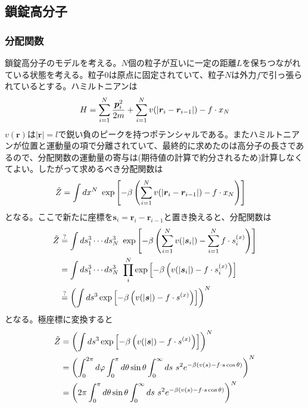 \documentclass[dvipdfmx, 11pt, a4paper]{jsarticle}
\theoremstyle{definition}
\begin{document}
\subsection{鎖錠高分子}
\subsubsection{分配関数}
    鎖錠高分子のモデルを考える。$N$個の粒子が互いに一定の距離$L$を保ちつながれている状態を考える。粒子$0$は原点に固定されていて、粒子$N$は外力$f$で引っ張られているとする。ハミルトニアンは
    \begin{align}
        H = \sum_{i=1}^N \frac{\bm{p}^2_i}{2m} + \sum_{i=1}^N v(|\bm{r}_i - \bm{r}_{i-1}|) - f \cdot x_N \notag 
    \end{align}
    $v(\bm{r})$は$|\bm{r}|=l$で鋭い負のピークを持つポテンシャルである。またハミルトニアンが位置と運動量の項で分離されていて、最終的に求めたのは高分子の長さであるので、分配関数の運動量の寄与は(期待値の計算で約分されるため)計算しなくてよい。したがって求めるべき分配関数は
    \begin{align}
        \tilde{Z} &= \int dx^N\ \exp \left[ -\beta \left( \sum_{i=1}^N v(|\bm{r}_i - \bm{r}_{i-1}|) - f \cdot x_N \right) \right] \notag 
    \end{align}
    となる。ここで新たに座標を$\bm{s}_i = \bm{r}_i - \bm{r}_{i-1}$と置き換えると、分配関数は
    \begin{align}
        \tilde{Z} &\overset{?}{=} \int ds_1^3 \cdots ds^3_N\  \exp \left[ -\beta \left( \sum_{i=1}^N v(|\bm{s}_i|) - \sum_{i=1}^Nf \cdot s^{(x)}_{i} \right) \right] \notag \\
        &= \int ds_1^3 \cdots ds^3_N\  \prod_i^N \exp \left[ -\beta \left( v(|\bm{s}_i|) - f \cdot s^{(x)}_{i} \right) \right] \notag \\ 
        &\overset{?}{=} \left( \int ds^3 \exp \left[ -\beta \left( v(|\bm{s}|) - f \cdot s^{(x)} \right) \right] \right)^N \notag 
    \end{align}
    となる。極座標に変換すると
    \begin{align}
        \tilde{Z} &= \left( \int ds^3 \exp \left[ -\beta \left( v(|\bm{s}|) - f \cdot s^{(x)} \right) \right] \right)^N \notag \\
        &= \left( \int_0^{2\pi} d\varphi \int_0^{\pi} d\theta \sin \theta \int_0^{\infty} ds\ s^2 e^{-\beta \left( v(s) - f \cdot s\cos \theta \right)} \right)^N \notag \\
        &= \left( 2\pi \int_0^{\pi} d\theta \sin \theta \int_0^{\infty} ds\ s^2e^{-\beta \left( v(s) - f \cdot s\cos \theta \right)} \right)^N \notag 
    \end{align}
\end{document}
